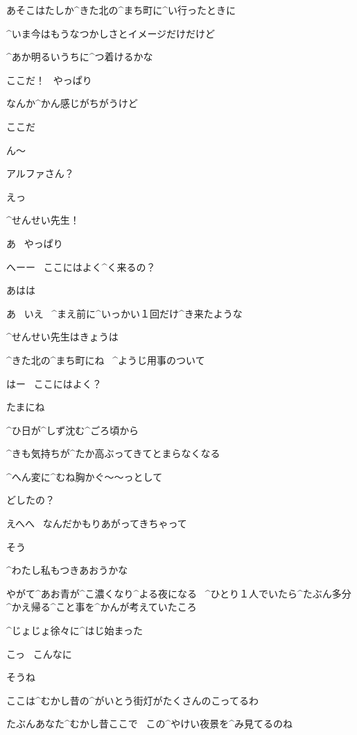 \page[106]
\Alpha あそこはたしか^{きた}{北}の^{まち}{町}に^{い}{行}ったときに

\Alpha ^{いま}{今}はもうなつかしさとイメージだけだけど

\Alpha ^{あか}{明}るいうちに^{つ}{着}けるかな

\page[107]
\Alpha ここだ！
\ やっぱり

\Alpha なんか^{かん}{感}じがちがうけど

\Alpha ここだ

\Alpha ん〜

\Sensei アルファさん？

\Alpha えっ

\page[108]
\Alpha ^{せんせい}{先生}！

\Sensei あ
\ やっぱり

\Sensei へーー
\ ここにはよく^{く}{来}るの？

\Alpha あはは

\Alpha あ
\ いえ
\ ^{まえ}{前}に^{いっかい}{１回}だけ^{き}{来}たような

\Alpha ^{せんせい}{先生}はきょうは

\Sensei ^{きた}{北}の^{まち}{町}にね
\ ^{ようじ}{用事}のついて

\Alpha はー
\ ここにはよく？

\Sensei たまにね

\page[109]
\Alpha ^{ひ}{日}が^{しず}{沈}む^{ごろ}{頃}から

\Alpha ^{きも}{気持}ちが^{たか}{高}ぶってきてとまらなくなる

\Alpha ^{へん}{変}に^{むね}{胸}かぐ〜〜っとして

\Sensei どしたの？

\Alpha えへへ
\ なんだかもりあがってきちゃって

\Sensei そう

\Sensei ^{わたし}{私}もつきあおうかな

\Alpha やがて^{あお}{青}が^{こ}{濃}くなり^{よる}{夜}になる
\ ^{ひとり}{１人}でいたら^{たぶん}{多分}^{かえ}{帰}る^{こと}{事}を^{かんが}{考}えていたころ

\Alpha ^{じょじょ}{徐々}に^{はじ}{始}まった

\page[112]
\Alpha こっ
\ こんなに

\page[113]
\Sensei そうね

\Sensei ここは^{むかし}{昔}の^{がいとう}{街灯}がたくさんのこってるわ

\Sensei たぶんあなた^{むかし}{昔}ここで
\ この^{やけい}{夜景}を^{み}{見}てるのね


